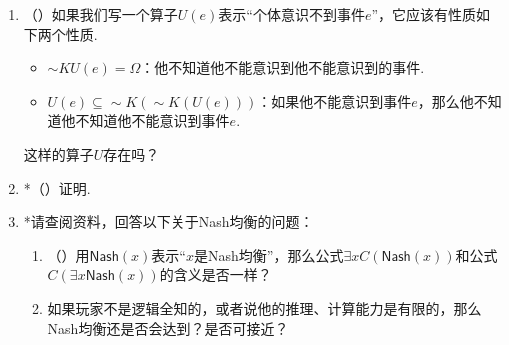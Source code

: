 \begin{enumerate}[wide, labelindent=0pt]
    \item \label{exercise:awareness-axiom} （\cite{dekelStandardStateSpaceModels1998}）如果我们写一个算子$U(e)$表示“个体意识不到事件$e$”，它应该有性质如下两个性质. 
    \begin{itemize}
        \item $\sim KU(e)=\Omega$：他不知道他不能意识到他不能意识到的事件.
        \item $U(e)\subseteq \sim K(\sim K(U(e)))$：如果他不能意识到事件$e$，那么他不知道他不知道他不能意识到事件$e$.
    \end{itemize}
    这样的算子$U$存在吗？

    \item *\label{exercise:Aumann-operator-iff}（\cite{bacharachExtensionsClaimAumann1985}）证明.
    
    \item *请查阅资料，回答以下关于Nash均衡的问题：
    \begin{enumerate}
        \item （\cite{kanekoGameLogicIts1996,kanekoGameLogicIts1997}）用$\mathsf{Nash}(x)$表示“$x$是Nash均衡”，那么公式$\exists x C(\mathsf{Nash}(x))$和公式$C(\exists x \mathsf{Nash}(x))$的含义是否一样？
        \item 如果玩家不是逻辑全知的，或者说他的推理、计算能力是有限的，那么Nash均衡还是否会达到？是否可接近？
    \end{enumerate}
\end{enumerate}

